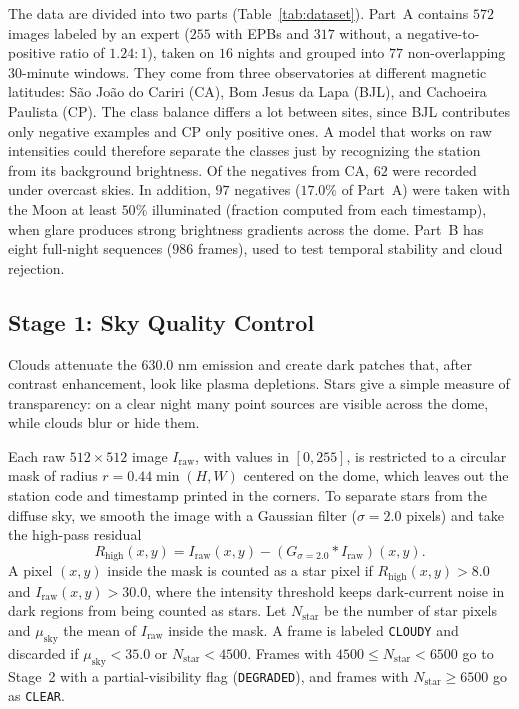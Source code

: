 The data are divided into two parts (Table~\ref{tab:dataset}). Part~A contains $572$ images labeled by an expert ($255$ with EPBs and $317$ without, a negative-to-positive ratio of $1.24:1$), taken on $16$ nights and grouped into $77$ non-overlapping $30$-minute windows. They come from three observatories at different magnetic latitudes: São João do Cariri (CA), Bom Jesus da Lapa (BJL), and Cachoeira Paulista (CP). The class balance differs a lot between sites, since BJL contributes only negative examples and CP only positive ones. A model that works on raw intensities could therefore separate the classes just by recognizing the station from its background brightness. Of the negatives from CA, $62$ were recorded under overcast skies. In addition, $97$ negatives ($17.0\%$ of Part~A) were taken with the Moon at least $50\%$ illuminated (fraction computed from each timestamp), when glare produces strong brightness gradients across the dome. Part~B has eight full-night sequences ($986$ frames), used to test temporal stability and cloud rejection.

\subsection{Stage 1: Sky Quality Control}\label{sec:stage1}

Clouds attenuate the $630.0\text{ nm}$ emission and create dark patches that, after contrast enhancement, look like plasma depletions. Stars give a simple measure of transparency: on a clear night many point sources are visible across the dome, while clouds blur or hide them.

Each raw $512 \times 512$ image $I_{\text{raw}}$, with values in $[0, 255]$, is restricted to a circular mask of radius $r = 0.44 \min(H, W)$ centered on the dome, which leaves out the station code and timestamp printed in the corners. To separate stars from the diffuse sky, we smooth the image with a Gaussian filter ($\sigma = 2.0$ pixels) and take the high-pass residual
\begin{equation}\label{eq:star_residual}
    R_{\text{high}}(x, y) = I_{\text{raw}}(x, y) - (G_{\sigma=2.0} * I_{\text{raw}})(x, y).
\end{equation}
A pixel $(x, y)$ inside the mask is counted as a star pixel if $R_{\text{high}}(x, y) > 8.0$ and $I_{\text{raw}}(x, y) > 30.0$, where the intensity threshold keeps dark-current noise in dark regions from being counted as stars. Let $N_{\text{star}}$ be the number of star pixels and $\mu_{\text{sky}}$ the mean of $I_{\text{raw}}$ inside the mask. A frame is labeled \texttt{CLOUDY} and discarded if $\mu_{\text{sky}} < 35.0$ or $N_{\text{star}} < 4500$. Frames with $4500 \le N_{\text{star}} < 6500$ go to Stage~2 with a partial-visibility flag (\texttt{DEGRADED}), and frames with $N_{\text{star}} \ge 6500$ go as \texttt{CLEAR}.

